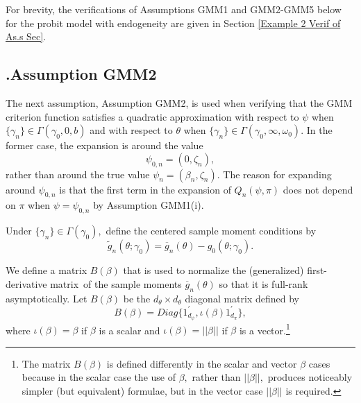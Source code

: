 \documentclass[12pt,titlepage,final,oneside,letterpaper]{article}
\begin{document}
For brevity, the verifications of Assumptions GMM1 and GMM2-GMM5 below for
the probit model with endogeneity are given in Section \ref{Example 2 Verif
of As.s Sec}.

\subsection{\hspace{-0.23in}\textbf{.}\hspace{0.18in}Assumption GMM2}

\hspace{0.25in}The next assumption, Assumption GMM2, is used when verifying
that the GMM criterion function satisfies a quadratic approximation with
respect to $\psi $ when $\{\gamma _{n}\}\in \Gamma (\gamma _{0},0,b)$ and
with respect to $\theta $ when $\{\gamma _{n}\}\in \Gamma (\gamma
_{0},\infty ,\omega _{0}).$ In the former case, the expansion is around the
value 
\begin{equation}
\psi _{0,n}=(0,\zeta _{n}),
\end{equation}%
rather than around the true value $\psi _{n}=(\beta _{n},\zeta _{n}).$ The
reason for expanding around $\psi _{0,n}$ is that the first term in the
expansion of $Q_{n}(\psi ,\pi )$ does not depend on $\pi $ when $\psi =\psi
_{0,n}$ by Assumption GMM1(i).

Under $\{\gamma _{n}\}\in \Gamma (\gamma _{0}),$ define the centered sample
moment conditions by 
\begin{equation}
\widetilde{g}_{n}\left( \theta ;\gamma _{0}\right) =\overline{g}_{n}\left(
\theta \right) -g_{0}\left( \theta ;\gamma _{0}\right) .
\end{equation}

We define a matrix $B(\beta )$ that is used to normalize the (generalized)
first-derivative matrix\ of the sample moments $\overline{g}_{n}(\theta )$
so that it is full-rank asymptotically. Let $B(\beta )$ be the $d_{\theta
}\times d_{\theta }$ diagonal matrix defined by%
\begin{equation}
B(\beta )=Diag\{1_{d_{\psi }}^{\prime },\iota (\beta )1_{d_{\pi }}^{\prime
}\},
\end{equation}%
where $\iota (\beta )=\beta $ if $\beta $ is a scalar and $\iota (\beta
)=||\beta ||$ if $\beta $ is a vector.\footnote{%
The matrix $B(\beta )$ is defined differently in the scalar and vector $%
\beta $ cases because in the scalar case the use of $\beta ,$ rather than $%
||\beta ||,$ produces noticeably simpler (but equivalent) formulae, but in
the vector case $||\beta ||$ is required.}\medskip
\end{document}
